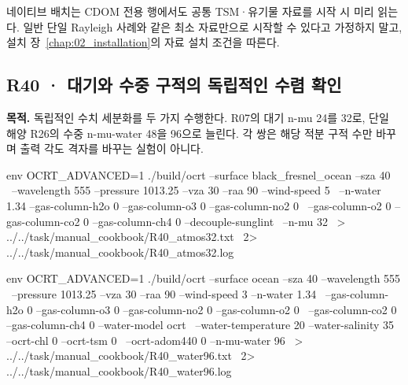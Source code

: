 네이티브 배치는 CDOM 전용 행에서도 공통 TSM·유기물 자료를 시작 시 미리 읽는다. 일반 단일 Rayleigh 사례와 같은 최소 자료만으로 시작할 수 있다고 가정하지 말고, 설치 장~\ref{chap:02_installation}의 자료 설치 조건을 따른다.

\clearpage

\subsection{R40 · 대기와 수중 구적의 독립적인 수렴 확인}
\label{sec:auto:09_cookbook:6.3}

\label{recipe:R40}

\textbf{목적. }독립적인 수치 세분화를 두 가지 수행한다. R07의 대기 n-mu 24를 32로, 단일 해양 R26의 수중 n-mu-water 48을 96으로 늘린다. 각 쌍은 해당 적분 구적 수만 바꾸며 출력 각도 격자를 바꾸는 실험이 아니다.

\noindent\begin{minipage}{\linewidth}
\begin{ManualCode}

env OCRT_ADVANCED=1 ./build/ocrt --surface black_fresnel_ocean --sza 40 \
  --wavelength 555 --pressure 1013.25 --vza 30 --raa 90 --wind-speed 5 \
  --n-water 1.34 --gas-column-h2o 0 --gas-column-o3 0 --gas-column-no2 0 \
  --gas-column-o2 0 --gas-column-co2 0 --gas-column-ch4 0 --decouple-sunglint \
  --n-mu 32 \
  > ../../task/manual_cookbook/R40_atmos32.txt \
  2> ../../task/manual_cookbook/R40_atmos32.log

\end{ManualCode}
\end{minipage}\par

\noindent\begin{minipage}{\linewidth}
\begin{ManualCode}

env OCRT_ADVANCED=1 ./build/ocrt --surface ocean --sza 40 --wavelength 555 \
  --pressure 1013.25 --vza 30 --raa 90 --wind-speed 3 --n-water 1.34 \
  --gas-column-h2o 0 --gas-column-o3 0 --gas-column-no2 0 --gas-column-o2 0 \
  --gas-column-co2 0 --gas-column-ch4 0 --water-model ocrt \
  --water-temperature 20 --water-salinity 35 --ocrt-chl 0 --ocrt-tsm 0 \
  --ocrt-adom440 0 --n-mu-water 96 \
  > ../../task/manual_cookbook/R40_water96.txt \
  2> ../../task/manual_cookbook/R40_water96.log

\end{ManualCode}
\end{minipage}\par


